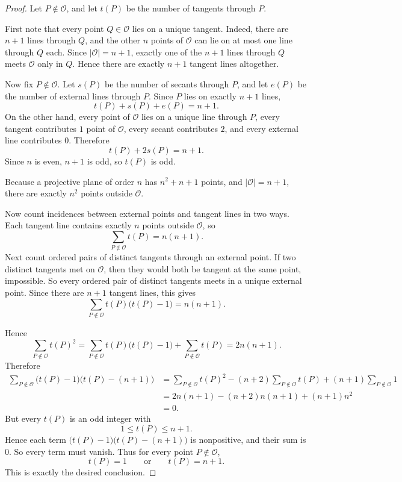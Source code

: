 \documentclass[11pt, a4paper]{ctexrep}
\begin{document}
\begin{proof}
    Let \(P\notin \mathcal{O}\), and let \(t(P)\) be the number of tangents through \(P\).

    First note that every point \(Q\in \mathcal{O}\) lies on a unique tangent. Indeed, there are \(n+1\) lines
    through \(Q\), and the other \(n\) points of \(\mathcal{O}\) can lie on at most one line through \(Q\) each.
    Since \(|\mathcal{O}|=n+1\), exactly one of the \(n+1\) lines through \(Q\) meets \(\mathcal{O}\) only in \(Q\).
    Hence there are exactly \(n+1\) tangent lines altogether.

    Now fix \(P\notin \mathcal{O}\). Let \(s(P)\) be the number of secants through \(P\), and let \(e(P)\) be
    the number of external lines through \(P\). Since \(P\) lies on exactly \(n+1\) lines,
    \[
        t(P)+s(P)+e(P)=n+1.
    \]
    On the other hand, every point of \(\mathcal{O}\) lies on a unique line through \(P\), every tangent
    contributes \(1\) point of \(\mathcal{O}\), every secant contributes \(2\), and every external line
    contributes \(0\). Therefore
    \[
        t(P)+2s(P)=n+1.
    \]
    Since \(n\) is even, \(n+1\) is odd, so \(t(P)\) is odd.

    Because a projective plane of order \(n\) has \(n^2+n+1\) points, and \(|\mathcal{O}|=n+1\), there are
    exactly \(n^2\) points outside \(\mathcal{O}\).

    Now count incidences between external points and tangent lines in two ways. Each tangent line contains
    exactly \(n\) points outside \(\mathcal{O}\), so
    \[
        \sum_{P\notin \mathcal{O}} t(P)=n(n+1).
    \]
    Next count ordered pairs of distinct tangents through an external point. If two distinct tangents met on
    \(\mathcal{O}\), then they would both be tangent at the same point, impossible. So every ordered pair of
    distinct tangents meets in a unique external point. Since there are \(n+1\) tangent lines, this gives
    \[
        \sum_{P\notin \mathcal{O}} t(P)\bigl(t(P)-1\bigr)=n(n+1).
    \]

    Hence
    \[
        \sum_{P\notin \mathcal{O}} t(P)^2
        =
        \sum_{P\notin \mathcal{O}} t(P)\bigl(t(P)-1\bigr)
        +
        \sum_{P\notin \mathcal{O}} t(P)
        =
        2n(n+1).
    \]
    Therefore
    \[
        \begin{aligned}
            \sum_{P\notin \mathcal{O}} \bigl(t(P)-1\bigr)\bigl(t(P)-(n+1)\bigr)
             & =
            \sum_{P\notin \mathcal{O}} t(P)^2
            -(n+2)\sum_{P\notin \mathcal{O}} t(P)
            +(n+1)\sum_{P\notin \mathcal{O}} 1 \\
             & =
            2n(n+1)-(n+2)n(n+1)+(n+1)n^2 \\
             & = 0.
        \end{aligned}
    \]
    But every \(t(P)\) is an odd integer with
    \[
        1\le t(P)\le n+1.
    \]
    Hence each term \(\bigl(t(P)-1\bigr)\bigl(t(P)-(n+1)\bigr)\) is nonpositive, and their sum is \(0\).
    So every term must vanish. Thus for every point \(P\notin \mathcal{O}\),
    \[
        t(P)=1
        \qquad\text{or}\qquad
        t(P)=n+1.
    \]
    This is exactly the desired conclusion.
\end{proof}
\end{document}
